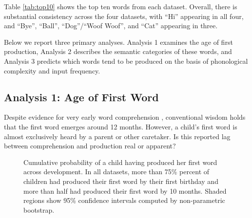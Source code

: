\documentclass[10pt,letterpaper]{article}
\begin{document}
Table \ref{tab:top10} shows the top ten words from each dataset. Overall, there is substantial consistency across the four datasets, with ``Hi'' appearing in all four, and ``Bye'', ``Ball'', ``Dog''/``Woof Woof'', and ``Cat'' appearing in three.

Below we report three primary analyses. Analysis 1 examines the age of first production, Analysis 2 describes the semantic categories of these words, and Analysis 3 predicts which words tend to be produced on the basis of phonological complexity and input frequency.

\subsection{Analysis 1: Age of First Word} 

Despite evidence for very early word comprehension \cite{tincoff2012,bergelson2012}, conventional wisdom holds that the first word emerges around 12 months. However, a child's first word is almost exclusively heard by a parent or other caretaker. Is this reported lag between comprehension and production real or apparent? 



\begin{figure}[tb]
\caption{\label{fig:cdfs} Cumulative probability of a child having produced her first word across development. In all datasets, more than 75\% percent of children had produced their first word by their first birthday and more than half had produced their first word by 10 months. Shaded regions show 95\% confidence intervals computed by non-parametric bootstrap.}
\vspace{-1.4em}
\end{figure}
\end{document}
